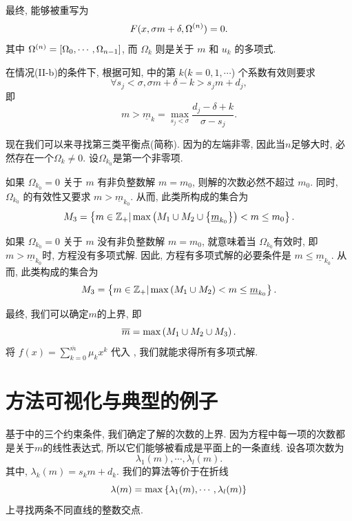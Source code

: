 最终,  能够被重写为
\begin{equation}
F(x,\sigma m + \delta,\Omega^{(n)})=0. 
\label{eq-np}
\end{equation}
其中 $\Omega^{(n)}=\left[\Omega_0,\cdots,\Omega_{n-1}\right]$, 而 $\Omega_k$ 则是关于 $m$ 和 $u_k$ 的多项式.

在情况(II-b)的条件下, 根据可知, 中的第 $k$($k=0,1,\cdots$) 个系数有效则要求 
\begin{equation}
\forall s_j<\sigma, \sigma m + \delta - k > s_j m + d_j,
\end{equation}
即
\begin{equation}
m > \underline{m}_k=\underset{s_j<\sigma}{\max}{\frac{d_j-\delta+k}{\sigma-s_j}}.
\end{equation}

现在我们可以来寻找第三类平衡点(简称\BPthree{}). 因为的左端非零, 因此当$n$足够大时, 必然存在一个$\Omega_k\neq 0$. 设$\Omega_{k_0}$是第一个非零项. 

如果 $\Omega_{k_0}=0$ 关于 $m$ 有非负整数解 $m=m_0$, 则解的次数必然不超过 $m_0$. 同时, $\Omega_{k_0}$ 的有效性又要求 $m>\underline{m}_{k_0}$. 从而, 此类\BPthree{}所构成的集合为 
\begin{equation}
M_3=\left\{m\in \mathbb Z_+|\max\left(M_1\cup M_2 \cup \left\{\underline{m}_{k_0}\right\}\right)<m\le m_0\right\}.
\end{equation}

如果 $\Omega_{k_0}=0$ 关于 $m$ 没有非负整数解 $m=m_0$, 就意味着当 $\Omega_{k_0}$有效时, 即$m>\underline{m}_{k_0}$时, 方程没有多项式解. 因此, 方程有多项式解的必要条件是 $m\le \underline{m}_{k_0}$. 从而, 此类\BPthree{}构成的集合为 
\begin{equation}
M_3=\left\{m\in \mathbb Z_+|\max\left(M_1\cup M_2\right)<m\le \underline{m}_{k_0}\right\}.
\end{equation}

最终, 我们可以确定$m$的上界, 即
\begin{equation}
\overline m =\max\left(M_1\cup M_2\cup M_3\right).
\end{equation}
将 $f(x)=\sum_{k=0}^{\overline m}{\mu_k x^k}$ 代入 , 我们就能求得所有多项式解.

\section{方法可视化与典型的例子}
基于中的三个约束条件, 我们确定了解的次数的上界. 因为方程中每一项的次数都是关于$m$的线性表达式, 所以它们能够被看成是平面上的一条直线. 设各项次数为 
\begin{equation}
\lambda_1(m),\cdots,\lambda_l(m). \label{lines}
\end{equation}
其中, $\lambda_k(m)=s_k m+d_k$. 我们的算法等价于在折线
\begin{equation}
\lambda(m)=\max\left\{\lambda_1(m),\cdots,\lambda_l(m)\right\} \label{broken_line}
\end{equation}
上寻找两条不同直线的整数交点. 

